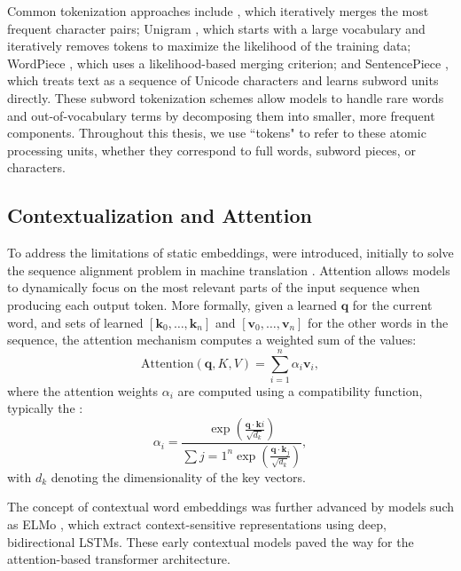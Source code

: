 Common tokenization approaches include  \citep{gage1994bpe, sennrich2016bpe}, which iteratively merges the most frequent character pairs; Unigram \citep{kudo2018unigram}, which starts with a large vocabulary and iteratively removes tokens to maximize the likelihood of the training data; WordPiece \citep{wu2016google}, which uses a likelihood-based merging criterion; and SentencePiece \citep{kudo2018sentencepiece}, which treats text as a sequence of Unicode characters and learns subword units directly. These subword tokenization schemes allow models to handle rare words and out-of-vocabulary terms by decomposing them into smaller, more frequent components. Throughout this thesis, we use ``tokens" to refer to these atomic processing units, whether they correspond to full words, subword pieces, or characters.

\subsection{Contextualization and Attention}
To address the limitations of static embeddings,  were introduced, initially to solve the sequence alignment problem in machine translation \citep{bahdanau2015neural,luong2015effective}. Attention allows models to dynamically focus on the most relevant parts of the input sequence when producing each output token. More formally, given a learned  $\mathbf{q}$ for the current word, and sets of learned  $[\mathbf{k}_0, \ldots, \mathbf{k}_n]$ and  $[\mathbf{v}_0, \ldots, \mathbf{v}_n]$ for the other words in the sequence, the attention mechanism computes a weighted sum of the values:
\begin{equation}
\text{Attention}(\mathbf{q}, K, V) = \sum_{i=1}^{n} \alpha_i \mathbf{v}_i,
\end{equation}
where the attention weights $\alpha_i$ are computed using a compatibility function, typically the :
\begin{equation}
\alpha_i = \frac{\exp\left(\frac{\mathbf{q} \cdot \mathbf{k}i}{\sqrt{d_k}}\right)}{\sum{j=1}^{n} \exp\left(\frac{\mathbf{q} \cdot \mathbf{k}_j}{\sqrt{d_k}}\right)},
\end{equation}
with $d_k$ denoting the dimensionality of the key vectors. 

The concept of contextual word embeddings was further advanced by models such as ELMo \citep{peters2018deep}, which extract context-sensitive representations using deep, bidirectional LSTMs. These early contextual models paved the way for the attention-based transformer architecture.

